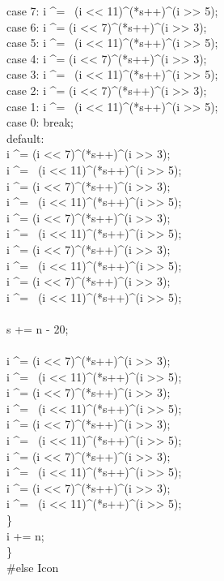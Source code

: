 {\>\>\> case 7:   i \^{}= ~(i <{}< 11)\^{}(*s++)\^{}(i >{}> 5);\\
\>\>\> case 6:   i \^{}= (i <{}< 7)\^{}(*s++)\^{}(i >{}> 3);\\
\>\>\> case 5:   i \^{}= ~(i <{}< 11)\^{}(*s++)\^{}(i >{}> 5);\\
\>\>\> case 4:   i \^{}= (i <{}< 7)\^{}(*s++)\^{}(i >{}> 3);\\
\>\>\> case 3:   i \^{}= ~(i <{}< 11)\^{}(*s++)\^{}(i >{}> 5);\\
\>\>\> case 2:   i \^{}= (i <{}< 7)\^{}(*s++)\^{}(i >{}> 3);\\
\>\>\> case 1:   i \^{}= ~(i <{}< 11)\^{}(*s++)\^{}(i >{}> 5);\\
\>\>\> case 0:   break;\\
\>\>\> default:\\
\>\>\>\>i \^{}= (i <{}< 7)\^{}(*s++)\^{}(i >{}> 3);\\
\>\>\>\>i \^{}= ~(i <{}< 11)\^{}(*s++)\^{}(i >{}> 5);\\
\>\>\>\>i \^{}= (i <{}< 7)\^{}(*s++)\^{}(i >{}> 3);\\
\>\>\>\>i \^{}= ~(i <{}< 11)\^{}(*s++)\^{}(i >{}> 5);\\
\>\>\>\>i \^{}= (i <{}< 7)\^{}(*s++)\^{}(i >{}> 3);\\
\>\>\>\>i \^{}= ~(i <{}< 11)\^{}(*s++)\^{}(i >{}> 5);\\
\>\>\>\>i \^{}= (i <{}< 7)\^{}(*s++)\^{}(i >{}> 3);\\
\>\>\>\>i \^{}= ~(i <{}< 11)\^{}(*s++)\^{}(i >{}> 5);\\
\>\>\>\>i \^{}= (i <{}< 7)\^{}(*s++)\^{}(i >{}> 3);\\
\>\>\>\>i \^{}= ~(i <{}< 11)\^{}(*s++)\^{}(i >{}> 5);\\
\>\>\>\>\\
\>\>\>\>s += n - 20;\\
\\
\>\>\>\>i \^{}= (i <{}< 7)\^{}(*s++)\^{}(i >{}> 3);\\
\>\>\>\>i \^{}= ~(i <{}< 11)\^{}(*s++)\^{}(i >{}> 5);\\
\>\>\>\>i \^{}= (i <{}< 7)\^{}(*s++)\^{}(i >{}> 3);\\
\>\>\>\>i \^{}= ~(i <{}< 11)\^{}(*s++)\^{}(i >{}> 5);\\
\>\>\>\>i \^{}= (i <{}< 7)\^{}(*s++)\^{}(i >{}> 3);\\
\>\>\>\>i \^{}= ~(i <{}< 11)\^{}(*s++)\^{}(i >{}> 5);\\
\>\>\>\>i \^{}= (i <{}< 7)\^{}(*s++)\^{}(i >{}> 3);\\
\>\>\>\>i \^{}= ~(i <{}< 11)\^{}(*s++)\^{}(i >{}> 5);\\
\>\>\>\>i \^{}= (i <{}< 7)\^{}(*s++)\^{}(i >{}> 3);\\
\>\>\>\>i \^{}= ~(i <{}< 11)\^{}(*s++)\^{}(i >{}> 5);\\
\>\>\}\\
\>\> i += n;\\
\>\}\\
\#else Icon
}


